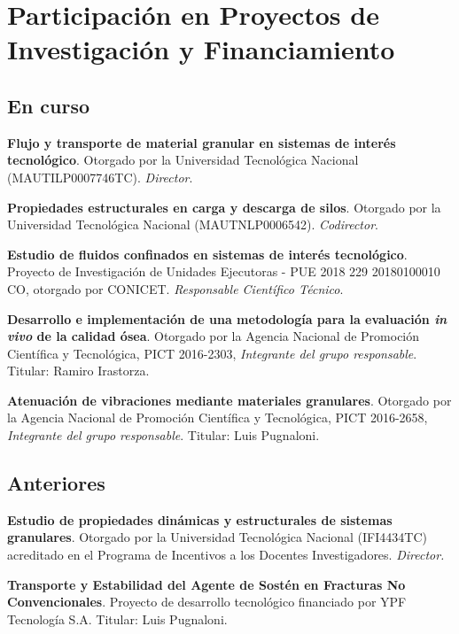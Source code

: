 \section{Participación en Proyectos de Investigación y Financiamiento}
\subsection{En curso}

 \textbf{Flujo y transporte de material granular en sistemas de interés tecnológico}. Otorgado por la Universidad Tecnológica Nacional (MAUTILP0007746TC). \textit{Director}.

 \textbf{Propiedades estructurales en carga y descarga de silos}. Otorgado por la Universidad Tecnológica Nacional (MAUTNLP0006542). \textit{Codirector}.

 \textbf{Estudio de fluidos confinados en sistemas de interés tecnológico}. Proyecto de Investigación de Unidades Ejecutoras - PUE 2018 229 20180100010 CO, otorgado por CONICET. \textit{Responsable Científico Técnico}.

 \textbf{Desarrollo e implementación de una metodología para la evaluación \textit{in vivo} de la calidad ósea}. Otorgado por la Agencia Nacional de Promoción Científica y Tecnológica, PICT 2016-2303, \textit{Integrante del grupo responsable}. Titular: Ramiro Irastorza.

 \textbf{Atenuación de vibraciones mediante materiales granulares}. Otorgado por la Agencia Nacional de Promoción Científica y Tecnológica, PICT 2016-2658, \textit{Integrante del grupo responsable}. Titular: Luis Pugnaloni.



\subsection{Anteriores}

 \textbf{Estudio de propiedades dinámicas y estructurales de sistemas granulares}. Otorgado por la Universidad Tecnológica Nacional (IFI4434TC) acreditado en el Programa de Incentivos a los Docentes Investigadores. \textit{Director.}

 \textbf{Transporte y Estabilidad del Agente de Sostén en Fracturas No Convencionales}. Proyecto de desarrollo tecnológico financiado por YPF Tecnología S.A. Titular: Luis Pugnaloni.

